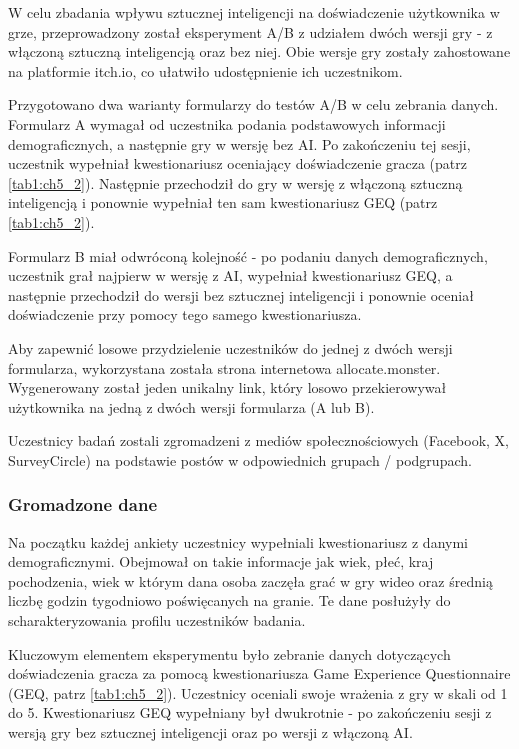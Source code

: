 W celu zbadania wpływu sztucznej inteligencji na doświadczenie użytkownika w grze, przeprowadzony
został eksperyment A/B z udziałem dwóch wersji gry - z włączoną sztuczną inteligencją oraz bez niej.
Obie wersje gry zostały zahostowane na platformie itch.io, co ułatwiło udostępnienie ich uczestnikom.

Przygotowano dwa warianty formularzy do testów A/B w celu zebrania danych. Formularz A wymagał od
uczestnika podania podstawowych informacji demograficznych, a następnie gry w wersję bez AI. Po
zakończeniu tej sesji, uczestnik wypełniał kwestionariusz oceniający doświadczenie gracza (patrz \ref{tab1:ch5_2}).
Następnie przechodził do gry w wersję z włączoną sztuczną inteligencją i ponownie wypełniał ten
sam kwestionariusz GEQ (patrz \ref{tab1:ch5_2}).

Formularz B miał odwróconą kolejność - po podaniu danych demograficznych, uczestnik grał najpierw
w wersję z AI, wypełniał kwestionariusz GEQ, a następnie przechodził do wersji bez sztucznej
inteligencji i ponownie oceniał doświadczenie przy pomocy tego samego kwestionariusza.

Aby zapewnić losowe przydzielenie uczestników do jednej z dwóch wersji formularza, wykorzystana
została strona internetowa allocate.monster. Wygenerowany został jeden unikalny link, który losowo
przekierowywał użytkownika na jedną z dwóch wersji formularza (A lub B).

Uczestnicy badań zostali zgromadzeni z mediów społecznościowych (Facebook, X, SurveyCircle) na podstawie
postów w odpowiednich grupach / podgrupach.

\subsubsection*{Gromadzone dane}

Na początku każdej ankiety uczestnicy wypełniali kwestionariusz z danymi demograficznymi. Obejmował
on takie informacje jak wiek, płeć, kraj pochodzenia, wiek w którym dana osoba zaczęła grać w gry
wideo oraz średnią liczbę godzin tygodniowo poświęcanych na granie. Te dane posłużyły do
scharakteryzowania profilu uczestników badania.

Kluczowym elementem eksperymentu było zebranie danych dotyczących doświadczenia gracza za pomocą
kwestionariusza Game Experience Questionnaire (GEQ, patrz \ref{tab1:ch5_2}). Uczestnicy oceniali swoje
wrażenia z gry w skali od 1 do 5. Kwestionariusz GEQ wypełniany był dwukrotnie - po zakończeniu sesji z
wersją gry bez sztucznej inteligencji oraz po wersji z włączoną AI.

